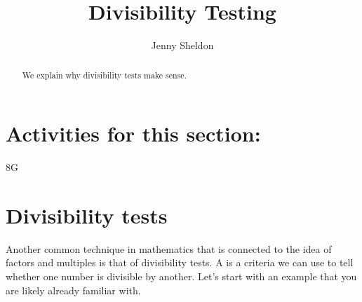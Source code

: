 \documentclass{ximera}
\title{Divisibility Testing}
\author{Jenny Sheldon}
\begin{document}
\begin{abstract}
We explain why divisibility tests make sense.
\end{abstract}
\maketitle

\section{Activities for this section:} 8G

\section{Divisibility tests}

Another common technique in mathematics that is connected to the idea of factors and multiples is that of divisibility tests. A  is a criteria we can use to tell whether one number is divisible by another. Let's start with an example that you are likely already familiar with.
\end{document}
